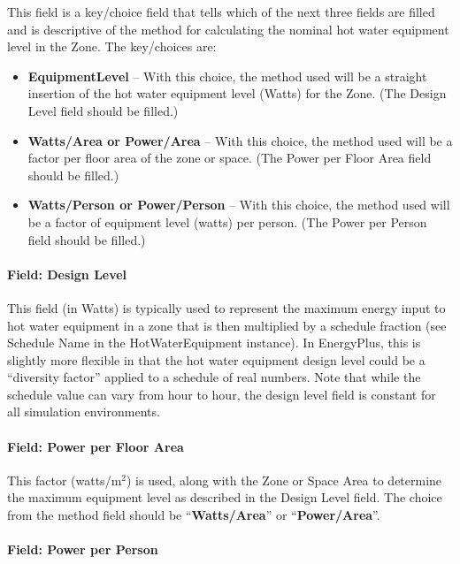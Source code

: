 This field is a key/choice field that tells which of the next three fields are filled and is descriptive of the method for calculating the nominal hot water equipment level in the Zone. The key/choices are:

\begin{itemize}
\tightlist
\item
  \textbf{EquipmentLevel} -- With this choice, the method used will be a straight insertion of the hot water equipment level (Watts) for the Zone. (The Design Level field should be filled.)
\item
  \textbf{Watts/Area or Power/Area} -- With this choice, the method used will be a factor per floor area of the zone or space. (The Power per Floor Area field should be filled.)
\item
  \textbf{Watts/Person or Power/Person} -- With this choice, the method used will be a factor of equipment level (watts) per person. (The Power per Person field should be filled.)
\end{itemize}

\paragraph{Field: Design Level}\label{field-design-level-2-000-hw-definition}

This field (in Watts) is typically used to represent the maximum energy input to hot water equipment in a zone that is then multiplied by a schedule fraction (see Schedule Name in the HotWaterEquipment instance). In EnergyPlus, this is slightly more flexible in that the hot water equipment design level could be a ``diversity factor'' applied to a schedule of real numbers. Note that while the schedule value can vary from hour to hour, the design level field is constant for all simulation environments.

\paragraph{Field: Power per Floor Area}\label{field-power-per-zone-floor-area-1-hw-definition}

This factor (watts/m\(^{2}\)) is used, along with the Zone or Space Area to determine the maximum equipment level as described in the Design Level field. The choice from the method field should be ``\textbf{Watts/Area}'' or ``\textbf{Power/Area}''.

\paragraph{Field: Power per Person}\label{field-power-per-person-1-hw-definition}

